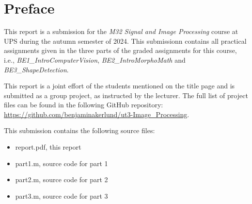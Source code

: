 \section*{Preface}


This report is a submission for the \textit{M32 Signal and Image Processing} course at \ac{UPS} during the autumn semester of 2024.
This submissionn contains all practical assignments given in the three parts of the graded assignments for this course, i.e., \textit{BE1\_IntroComputerVision}, \textit{BE2\_IntroMorphoMath} and \textit{BE3\_ShapeDetection}.

This report is a joint effort of the students mentioned on the title page and is submitted as a group project, as instructed by the lecturer.
The full list of project files can be found in the following GitHub repository: \url{https://github.com/benjaminakerlund/ut3-Image_Processing}.

This submission contains the following source files:
\begin{itemize}
    \item report.pdf, this report
    \item part1.m, source code for part 1
    \item part2.m, source code for part 2
    \item part3.m, source code for part 3
\end{itemize}




\vspace{2cm}





